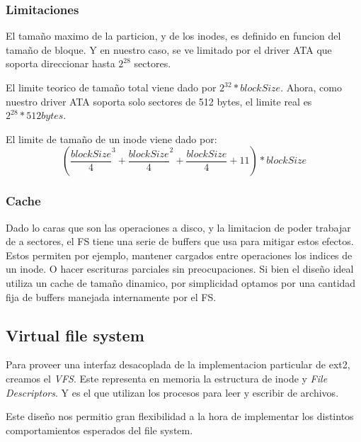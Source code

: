 \documentclass[a4paper,10pt]{article}
\begin{document}
\subsubsection{Limitaciones}
El tamaño maximo de la particion, y de los inodes, es definido en funcion del tamaño de bloque.
Y en nuestro caso, se ve limitado por el driver ATA que soporta direccionar hasta $ 2^{28} $ sectores.

El limite teorico de tamaño total viene dado por $ 2^{32} * blockSize $.
Ahora, como nuestro driver ATA soporta solo sectores de 512 bytes, el limite real es $ 2^{28} * 512 bytes $.

El limite de tamaño de un inode viene dado por:
$$( \frac{blockSize}{4}^3 + \frac{blockSize}{4}^2 + \frac{blockSize}{4} + 11 ) * blockSize $$

\subsubsection{Cache}
Dado lo caras que son las operaciones a disco, y la limitacion de poder trabajar de a sectores, el FS tiene una serie de buffers que usa para mitigar estos efectos.
Estos permiten por ejemplo, mantener cargados entre operaciones los indices de un inode.
O hacer escrituras parciales sin preocupaciones.
Si bien el diseño ideal utiliza un cache de tamaño dinamico, por simplicidad optamos por una cantidad fija de buffers manejada internamente por el FS.

\subsection{Virtual file system}

Para proveer una interfaz desacoplada de la implementacion particular de ext2, creamos el \textit{VFS}.
Este representa en memoria la estructura de inode y \textit{File Descriptors}.
Y es el que utilizan los procesos para leer y escribir de archivos.

Este diseño nos permitio gran flexibilidad a la hora de implementar los distintos comportamientos esperados del file system.
\end{document}
